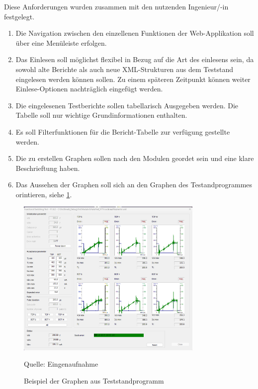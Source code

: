 Diese Anforderungen wurden zusammen mit den nutzenden Ingenieur/-in festgelegt.
\begin{enumerate}ausgearbeitet.

    \item Die Navigation zwischen den einzellenen Funktionen der Web-Applikation soll über eine Menüleiste erfolgen.
    \item Das Einlesen soll möglichst flexibel in Bezug auf die Art des einlesens sein, da sowohl alte Berichte als auch
    neue XML-Strukturen aus dem Teststand eingelesen werden können sollen. Zu einem späteren Zeitpunkt können weiter
    Einlese-Optionen nachträglich eingefügt werden.
    \item Die eingelesenen Testberichte sollen tabellarisch Ausgegeben werden. Die Tabelle soll nur wichtige
    Grundinformationen enthalten.
    \item Es soll Filterfunktionen für die Bericht-Tabelle zur verfügung gestellte werden.
    \item Die zu erstellen Graphen sollen nach den Modulen geordet sein und eine klare Beschrieftung haben.
    \item Das Aussehen der Graphen soll sich an den Graphen des Testandprogrammes orintieren, siehe \ref{fig:2. Beispiel der Graphen aus Teststandprogramm}.

\end{enumerate}

\begin{figure}[h]
    \centering
    \includegraphics[width=0.8\textwidth]{Grafiken/Beispiel_Teststandgraphen}
    \caption{Beispiel der Graphen aus Teststandprogramm}
    \label{fig:2. Beispiel der Graphen aus Teststandprogramm}
    {Quelle: Eingenaufnahme}
\end{figure}